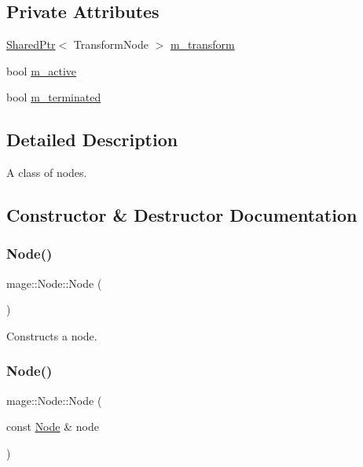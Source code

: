 \subsection*{Private Attributes}
\begin{DoxyCompactItemize}
\item 
\hyperlink{namespacemage_a1e01ae66713838a7a67d30e44c67703e}{Shared\+Ptr}$<$ Transform\+Node $>$ \hyperlink{classmage_1_1_node_a0b8161cc8480dcd9340309c3773c49f2}{m\+\_\+transform}
\item 
bool \hyperlink{classmage_1_1_node_ac4dd6c399de8b2a92df92365df7ecdac}{m\+\_\+active}
\item 
bool \hyperlink{classmage_1_1_node_aefb6986428c3dc24540af824a230b61d}{m\+\_\+terminated}
\end{DoxyCompactItemize}


\subsection{Detailed Description}
A class of nodes. 

\subsection{Constructor \& Destructor Documentation}
\hypertarget{classmage_1_1_node_a58b816eaa1dfd3c4b7f14896f190587f}{}\label{classmage_1_1_node_a58b816eaa1dfd3c4b7f14896f190587f} 
\subsubsection{\texorpdfstring{Node()}{Node()}\hspace{0.1cm}{\footnotesize\ttfamily [1/3]}}
{\footnotesize\ttfamily mage\+::\+Node\+::\+Node (\begin{DoxyParamCaption}{ }\end{DoxyParamCaption})}

Constructs a node. \hypertarget{classmage_1_1_node_af9da591163469f210895f3a5b389d7cc}{}\label{classmage_1_1_node_af9da591163469f210895f3a5b389d7cc} 
\subsubsection{\texorpdfstring{Node()}{Node()}\hspace{0.1cm}{\footnotesize\ttfamily [2/3]}}
{\footnotesize\ttfamily mage\+::\+Node\+::\+Node (\begin{DoxyParamCaption}\item[{const \hyperlink{classmage_1_1_node}{Node} \&}]{node }\end{DoxyParamCaption})}

